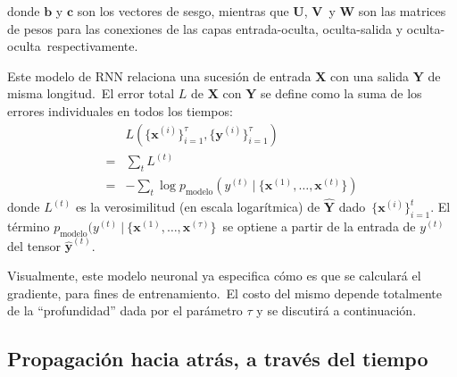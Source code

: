donde $\mathbf{b}$ y $\mathbf{c}$ son los vectores de sesgo, mientras que $\mathbf{U}$, $\mathbf{V}$\
y $\mathbf{W}$ son las matrices de pesos para las conexiones de las capas entrada-oculta, oculta-salida y oculta-oculta\
respectivamente.\par
Este modelo de RNN relaciona una sucesión de entrada $\mathbf{X}$ con una salida $\mathbf{Y}$ de misma longitud.\
El error total $L$ de $\mathbf{X}$ con $\mathbf{Y}$ se define como la suma de los errores individuales en todos los tiempos:
\begin{align}
  &L(\{\mathbf{x}^{(i)}\}_{i = 1}^{\tau}, \{\mathbf{y}^{(i)}\}_{i = 1}^{\tau})\\
  =& \sum_t L^{(t)}\\
  =& - \sum_t \log p_{\text{modelo}}(y^{(t)}\ |\ \{\mathbf{x}^{(1)},\ldots,\mathbf{x}^{(t)}\})
\end{align}
donde $L^{(t)}$ es la verosimilitud (en escala logarítmica) de $\mathbf{\hat{Y}}$ dado\
$\{\mathbf{x}^{(i)}\}_{i = 1}^{t}$. El término $p_{\text{modelo}}(y^{(t)}\ |\ \{\mathbf{x}^{(1)},\ldots,\mathbf{x}^{(\tau)}\}$\
se optiene a partir de la entrada de $y^{(t)}$ del tensor $\mathbf{\hat{y}}^{(t)}$.\par
Visualmente, este modelo neuronal ya especifica cómo es que se calculará el gradiente, para fines de entrenamiento.\
El costo del mismo depende totalmente de la ``profundidad'' dada por el parámetro $\tau$ y se discutirá a continuación.

\subsection{Propagación hacia atrás, a través del tiempo}

